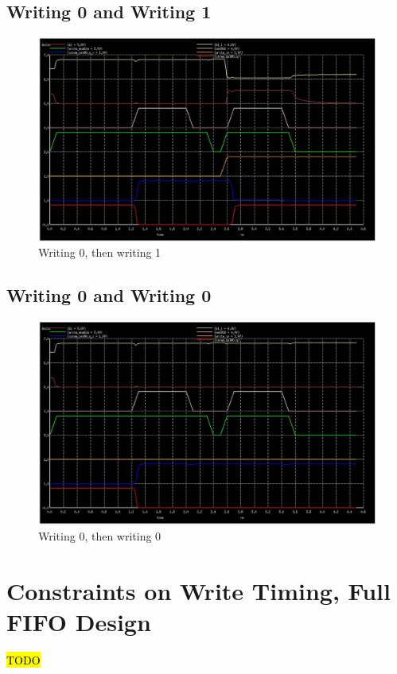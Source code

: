 \documentclass[12pt]{report}
\begin{document}
\subsection*{Writing 0 and Writing 1}
\begin{figure}[H]
  \centering
    \includegraphics[width=1.0\textwidth]{write_0_then_write_1.png}
  \caption{Writing 0, then writing 1}
  \label{fig:write_0_then_write_1}
\end{figure}

\subsection*{Writing 0 and Writing 0}
\begin{figure}[H]
  \centering
    \includegraphics[width=1.0\textwidth]{write_0_then_write_0.png}
  \caption{Writing 0, then writing 0}
  \label{fig:write_0_then_write_0}
\end{figure}

\section*{Constraints on Write Timing, Full FIFO Design}
\hl{TODO}
\end{document}
